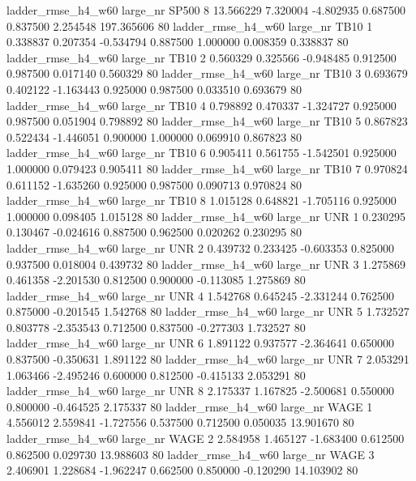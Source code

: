  ladder_rmse_h4_w60   large_nr    SP500                 8 13.566229  7.320004  -4.802935 0.687500 0.837500  2.254548  197.365606 80
 ladder_rmse_h4_w60   large_nr     TB10                 1  0.338837  0.207354  -0.534794 0.887500 1.000000  0.008359    0.338837 80
 ladder_rmse_h4_w60   large_nr     TB10                 2  0.560329  0.325566  -0.948485 0.912500 0.987500  0.017140    0.560329 80
 ladder_rmse_h4_w60   large_nr     TB10                 3  0.693679  0.402122  -1.163443 0.925000 0.987500  0.033510    0.693679 80
 ladder_rmse_h4_w60   large_nr     TB10                 4  0.798892  0.470337  -1.324727 0.925000 0.987500  0.051904    0.798892 80
 ladder_rmse_h4_w60   large_nr     TB10                 5  0.867823  0.522434  -1.446051 0.900000 1.000000  0.069910    0.867823 80
 ladder_rmse_h4_w60   large_nr     TB10                 6  0.905411  0.561755  -1.542501 0.925000 1.000000  0.079423    0.905411 80
 ladder_rmse_h4_w60   large_nr     TB10                 7  0.970824  0.611152  -1.635260 0.925000 0.987500  0.090713    0.970824 80
 ladder_rmse_h4_w60   large_nr     TB10                 8  1.015128  0.648821  -1.705116 0.925000 1.000000  0.098405    1.015128 80
 ladder_rmse_h4_w60   large_nr      UNR                 1  0.230295  0.130467  -0.024616 0.887500 0.962500  0.020262    0.230295 80
 ladder_rmse_h4_w60   large_nr      UNR                 2  0.439732  0.233425  -0.603353 0.825000 0.937500  0.018004    0.439732 80
 ladder_rmse_h4_w60   large_nr      UNR                 3  1.275869  0.461358  -2.201530 0.812500 0.900000 -0.113085    1.275869 80
 ladder_rmse_h4_w60   large_nr      UNR                 4  1.542768  0.645245  -2.331244 0.762500 0.875000 -0.201545    1.542768 80
 ladder_rmse_h4_w60   large_nr      UNR                 5  1.732527  0.803778  -2.353543 0.712500 0.837500 -0.277303    1.732527 80
 ladder_rmse_h4_w60   large_nr      UNR                 6  1.891122  0.937577  -2.364641 0.650000 0.837500 -0.350631    1.891122 80
 ladder_rmse_h4_w60   large_nr      UNR                 7  2.053291  1.063466  -2.495246 0.600000 0.812500 -0.415133    2.053291 80
 ladder_rmse_h4_w60   large_nr      UNR                 8  2.175337  1.167825  -2.500681 0.550000 0.800000 -0.464525    2.175337 80
 ladder_rmse_h4_w60   large_nr     WAGE                 1  4.556012  2.559841  -1.727556 0.537500 0.712500  0.050035   13.901670 80
 ladder_rmse_h4_w60   large_nr     WAGE                 2  2.584958  1.465127  -1.683400 0.612500 0.862500  0.029730   13.988603 80
 ladder_rmse_h4_w60   large_nr     WAGE                 3  2.406901  1.228684  -1.962247 0.662500 0.850000 -0.120290   14.103902 80

